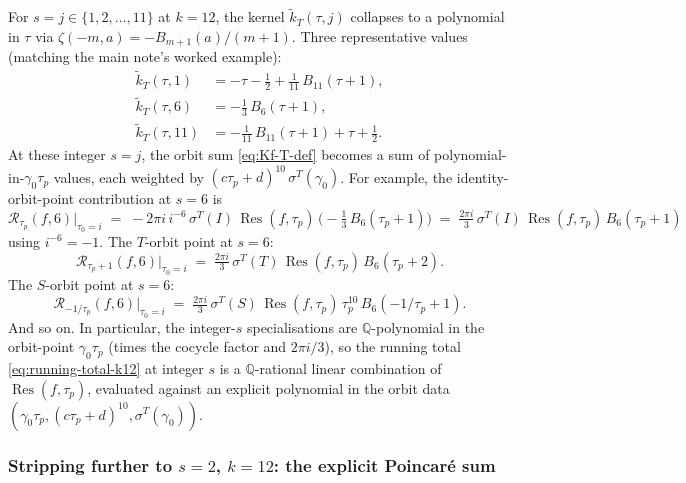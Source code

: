 \documentclass[11pt]{article}
\newcommand{\QQ}{\mathbb{Q}}
\DeclareMathOperator{\Res}{Res}
\begin{document}
For $s = j \in \{1, 2, \ldots, 11\}$ at $k = 12$, the kernel
$\widetilde{k}_T(\tau, j)$ collapses to a polynomial in $\tau$ via
$\zeta(-m, a) = -B_{m+1}(a)/(m + 1)$.  Three representative values
(matching the main note's worked example):
\begin{align}
  \widetilde{k}_T(\tau, 1) &= -\tau - \tfrac{1}{2} + \tfrac{1}{11}\,B_{11}(\tau + 1), \label{eq:kT-s1}\\
  \widetilde{k}_T(\tau, 6) &= -\tfrac{1}{3}\,B_6(\tau + 1), \label{eq:kT-s6}\\
  \widetilde{k}_T(\tau, 11) &= -\tfrac{1}{11}\,B_{11}(\tau + 1) + \tau + \tfrac{1}{2}. \label{eq:kT-s11}
\end{align}
At these integer $s = j$, the orbit sum \eqref{eq:Kf-T-def} becomes a
sum of polynomial-in-$\gamma_0\tau_p$ values, each weighted by
$(c\tau_p + d)^{10}\,\sigma^T(\gamma_0)$.  For example, the
identity-orbit-point contribution at $s = 6$ is
\begin{equation}\label{eq:res-I-s6}
  \mathcal{R}_{\tau_p}(f, 6)\bigl|_{\tau_0=i}
  \;=\; -2\pi i\,i^{-6}\,\sigma^T(I)\,\Res(f, \tau_p)\,
  \bigl(-\tfrac{1}{3}\,B_6(\tau_p + 1)\bigr)
  \;=\; \tfrac{2\pi i}{3}\,\sigma^T(I)\,\Res(f, \tau_p)\,B_6(\tau_p + 1)
\end{equation}
using $i^{-6} = -1$.  The $T$-orbit point at $s = 6$:
\begin{equation}\label{eq:res-T-s6}
  \mathcal{R}_{\tau_p + 1}(f, 6)\bigl|_{\tau_0=i}
  \;=\; \tfrac{2\pi i}{3}\,\sigma^T(T)\,\Res(f, \tau_p)\,B_6(\tau_p + 2).
\end{equation}
The $S$-orbit point at $s = 6$:
\begin{equation}\label{eq:res-S-s6}
  \mathcal{R}_{-1/\tau_p}(f, 6)\bigl|_{\tau_0=i}
  \;=\; \tfrac{2\pi i}{3}\,\sigma^T(S)\,\Res(f, \tau_p)\,\tau_p^{10}\,
  B_6(-1/\tau_p + 1).
\end{equation}
And so on.  In particular, the integer-$s$ specialisations are
$\QQ$-polynomial in the orbit-point $\gamma_0\tau_p$ (times the
cocycle factor and $2\pi i / 3$), so the running total
\eqref{eq:running-total-k12} at integer $s$ is a $\QQ$-rational
linear combination of $\Res(f, \tau_p)$, evaluated against an
explicit polynomial in the orbit data $(\gamma_0\tau_p,
(c\tau_p + d)^{10}, \sigma^T(\gamma_0))$.

\subsubsection*{Stripping further to $s = 2$, $k = 12$: the explicit Poincar\'e sum}
\end{document}
